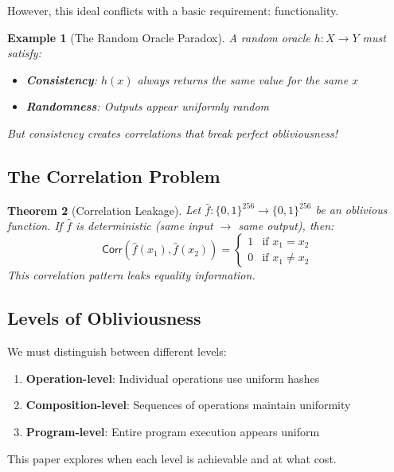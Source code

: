 \documentclass[11pt,final]{article}
\newcommand{\HashSpace}{\{0,1\}^{256}}
\newcommand{\Correlation}{\mathsf{Corr}}
\newtheorem{theorem}{Theorem}[section]
\newtheorem{example}[theorem]{Example}
\begin{document}
However, this ideal conflicts with a basic requirement: functionality.

\begin{example}[The Random Oracle Paradox]
A random oracle $h: X \to Y$ must satisfy:
\begin{itemize}
    \item \textbf{Consistency}: $h(x)$ always returns the same value for the same $x$
    \item \textbf{Randomness}: Outputs appear uniformly random
\end{itemize}
But consistency creates correlations that break perfect obliviousness!
\end{example}

\subsection{The Correlation Problem}

\begin{theorem}[Correlation Leakage]
Let $\hat{f}: \HashSpace \to \HashSpace$ be an oblivious function. If $\hat{f}$ is deterministic (same input $\to$ same output), then:
\begin{equation}
\Correlation(\hat{f}(x_1), \hat{f}(x_2)) = \begin{cases}
1 & \text{if } x_1 = x_2\\
0 & \text{if } x_1 \neq x_2
\end{cases}
\end{equation}
This correlation pattern leaks equality information.
\end{theorem}

\subsection{Levels of Obliviousness}

We must distinguish between different levels:

\begin{enumerate}
    \item \textbf{Operation-level}: Individual operations use uniform hashes
    \item \textbf{Composition-level}: Sequences of operations maintain uniformity
    \item \textbf{Program-level}: Entire program execution appears uniform
\end{enumerate}

This paper explores when each level is achievable and at what cost.
\end{document}
